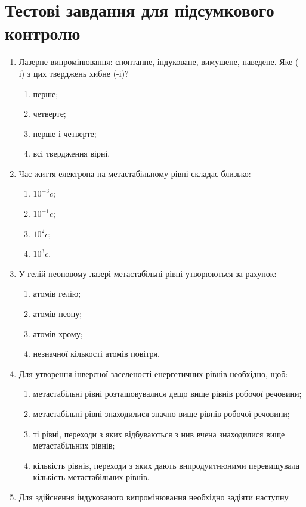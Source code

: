\documentclass[twocolumn]{el-author}
\begin{document}
\section{Тестові завдання для підсумкового контролю}

\begin{enumerate}
	\item Лазерне випромінювання: спонтанне, індуковане, вимушене, наведене. Яке
(-і) з цих тверджень хибне (-і)?
	\begin{enumerate}
		\item перше;
		\item четверте;
		\item перше і четверте;
		\item всі твердження вірні.
	\end{enumerate}
	\item Час життя електрона на метастабільному рівні складає близько:
	\begin{enumerate}
		\item $10^{-3}c$;
		\item $10^{-1}c$;
		\item $10^{2}c$;
		\item $10^{3}c$.
	\end{enumerate}
	\item  У гелій-неоновому лазері метастабільні рівні утворюються за рахунок:
	\begin{enumerate}
		\item атомів гелію;
		\item атомів неону;
		\item атомів хрому;
		\item незначної кількості атомів повітря.
	\end{enumerate}
	\item Для утворення інверсної заселеності енергетичних рівнів необхідно, щоб:
	\begin{enumerate}
		\item метастабільні рівні розташовувалися дещо вище рівнів робочої
речовини;
		\item метастабільні рівні знаходилися значно вище рівнів робочої речовини;
		\item ті рівні, переходи з яких відбуваються з нив вчена знаходилися
вище метастабільних рівнів;
		\item кількість рівнів, переходи з яких дають внпродуитнюними перевищувала
кількість метастабільних рівнів.
	\end{enumerate}
	\item Для здійснення індукованого випромінювання необхідно задіяти наступну

\end{enumerate}
\end{document}
